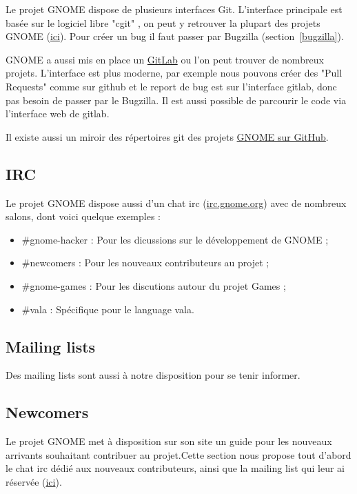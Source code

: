 \documentclass[12pt]{report}
\begin{document}
\label{cgit}
Le projet GNOME dispose de plusieurs interfaces Git. L'interface 
principale est basée sur le logiciel libre "cgit"
, on peut y retrouver la plupart des projets GNOME 
(\href{https://git.gnome.org/}{ici}). Pour créer un bug il faut passer par Bugzilla
(section~\ref{bugzilla}).

\label{gitlab}
GNOME a aussi mis en place un \href{https://gitlab.gnome.org/GNOME}{GitLab} 
ou l'on peut trouver de nombreux projets. L'interface est plus moderne,
par exemple nous pouvons créer des "Pull Requests" comme sur github
et le report de bug est sur l'interface gitlab, donc pas besoin de passer
par le Bugzilla. Il est aussi possible de parcourir le code via l'interface
web de gitlab.

\label{github}
Il existe aussi un miroir des répertoires git des projets 
\href{https://github.com/GNOME}{GNOME sur GitHub}.

\subsection{IRC}
Le projet GNOME dispose aussi d'un chat irc (\href{irc.gnome.org}{irc.gnome.org})
avec de nombreux salons, dont voici quelque exemples :
\begin{itemize}
\item \#gnome-hacker : Pour les dicussions sur le développement de GNOME ;
\item \#newcomers : Pour les nouveaux contributeurs au projet ;
\item \#gnome-games : Pour les discutions autour du projet Games ;
\item \#vala : Spécifique pour le language vala.
\end{itemize}

\subsection{Mailing lists}
Des mailing lists sont aussi à notre disposition pour se tenir informer.

\subsection{Newcomers}
Le projet GNOME met à disposition sur son site un guide pour les nouveaux
arrivants souhaitant contribuer au projet.Cette section nous propose
tout d'abord le chat irc dédié aux nouveaux contributeurs, ainsi que la
mailing list qui leur ai réservée
(\href{https://mail.gnome.org/mailman/listinfo/newscomers-list}{ici}).
\end{document}
